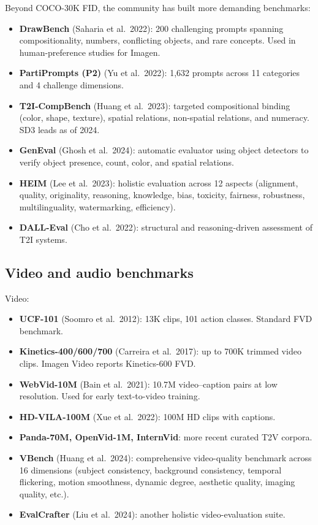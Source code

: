 Beyond COCO-30K FID, the community has built more demanding benchmarks:

\begin{itemize}
\tightlist
\item
  \textbf{DrawBench} (Saharia et al.~2022): 200 challenging prompts spanning compositionality, numbers, conflicting objects, and rare concepts. Used in human-preference studies for Imagen.
\item
  \textbf{PartiPrompts (P2)} (Yu et al.~2022): 1,632 prompts across 11 categories and 4 challenge dimensions.
\item
  \textbf{T2I-CompBench} (Huang et al.~2023): targeted compositional binding (color, shape, texture), spatial relations, non-spatial relations, and numeracy. SD3 leads as of 2024.
\item
  \textbf{GenEval} (Ghosh et al.~2024): automatic evaluator using object detectors to verify object presence, count, color, and spatial relations.
\item
  \textbf{HEIM} (Lee et al.~2023): holistic evaluation across 12 aspects (alignment, quality, originality, reasoning, knowledge, bias, toxicity, fairness, robustness, multilinguality, watermarking, efficiency).
\item
  \textbf{DALL-Eval} (Cho et al.~2022): structural and reasoning-driven assessment of T2I systems.
\end{itemize}

\subsection{Video and audio benchmarks}\label{video-and-audio-benchmarks}

Video:

\begin{itemize}
\tightlist
\item
  \textbf{UCF-101} (Soomro et al.~2012): 13K clips, 101 action classes. Standard FVD benchmark.
\item
  \textbf{Kinetics-400/600/700} (Carreira et al.~2017): up to 700K trimmed video clips. Imagen Video reports Kinetics-600 FVD.
\item
  \textbf{WebVid-10M} (Bain et al.~2021): 10.7M video--caption pairs at low resolution. Used for early text-to-video training.
\item
  \textbf{HD-VILA-100M} (Xue et al.~2022): 100M HD clips with captions.
\item
  \textbf{Panda-70M, OpenVid-1M, InternVid}: more recent curated T2V corpora.
\item
  \textbf{VBench} (Huang et al.~2024): comprehensive video-quality benchmark across 16 dimensions (subject consistency, background consistency, temporal flickering, motion smoothness, dynamic degree, aesthetic quality, imaging quality, etc.).
\item
  \textbf{EvalCrafter} (Liu et al.~2024): another holistic video-evaluation suite.
\end{itemize}

